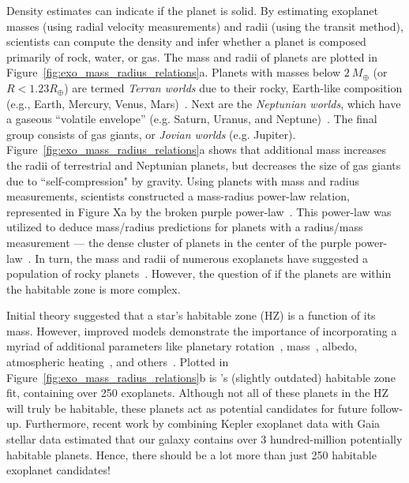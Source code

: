 Density estimates can indicate if the planet is solid.
By estimating exoplanet masses (using radial velocity measurements) and radii (using the transit method), scientists can compute the density and infer whether a planet is composed primarily of rock, water, or gas.
The mass and radii of planets are plotted in Figure~\ref{fig:exo_mass_radius_relations}a. 
Planets with masses below $2\ M_{\oplus}$ (or $R < 1.23 R_{\oplus}$) are termed \textit{Terran worlds} due to their rocky, Earth-like composition (e.g., Earth, Mercury, Venus, Mars)~\cite{}.
Next are the \textit{Neptunian worlds}, which have a gaseous ``volatile envelope'' (e.g. Saturn, Uranus, and Neptune)~\cite{Chen:2017:ApJ}.
The final group consists of gas giants, or \textit{Jovian worlds} (e.g. Jupiter).
Figure~\ref{fig:exo_mass_radius_relations}a shows that additional mass increases the radii of terrestrial and Neptunian planets, but decreases the size of gas giants due to ``self-compression" by gravity.
Using planets with mass and radius measurements, scientists constructed a mass-radius power-law relation, represented in Figure Xa by the broken purple power-law~\cite{Chen:2017:ApJ}.
This power-law was utilized to deduce mass/radius predictions for planets with a radius/mass measurement — the dense cluster of planets in the center of the purple power-law~\cite{Chen:2017:ApJ}.
In turn, the mass and radii of numerous exoplanets have suggested a population of rocky planets~\cite{kepler_mission}.
However, the question of if the planets are within the habitable zone is more complex.


Initial theory suggested that a star's habitable zone (HZ) is a function of its mass. 
However, improved models demonstrate the importance of incorporating a myriad of additional parameters like planetary rotation~\cite{Yang:2014:ApJL},  mass~\cite{Kopparapu:2014:ApJL}, albedo, atmospheric heating~\cite{Kasting:2011:AsBio}, and others~\cite{Kopparapu:2013:ApJ, Kopparapu:2014:ApJL, Shields:2014:ApJL}. 
Plotted in Figure~\ref{fig:exo_mass_radius_relations}b is \citet{Kopparapu:2014:ApJL}'s (slightly outdated) habitable zone fit, containing over 250 exoplanets.
Although not all of these planets in the HZ will truly be habitable, these planets act as potential candidates for future follow-up. 
Furthermore, recent work by 
\citet{Bryson:2021:AJ} combining Kepler exoplanet data with Gaia stellar data estimated that our galaxy contains over 3 hundred-million potentially habitable planets.
Hence, there should be a lot more than just 250 habitable exoplanet candidates! 









